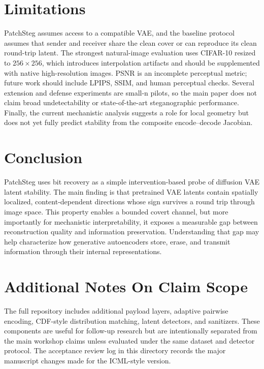 \documentclass{article}
\begin{document}
\section{Limitations}

PatchSteg assumes access to a compatible VAE, and the baseline protocol assumes that sender and receiver share the clean cover or can reproduce its clean round-trip latent. The strongest natural-image evaluation uses CIFAR-10 resized to $256\times256$, which introduces interpolation artifacts and should be supplemented with native high-resolution images. PSNR is an incomplete perceptual metric; future work should include LPIPS, SSIM, and human perceptual checks. Several extension and defense experiments are small-n pilots, so the main paper does not claim broad undetectability or state-of-the-art steganographic performance. Finally, the current mechanistic analysis suggests a role for local geometry but does not yet fully predict stability from the composite encode--decode Jacobian.

\section{Conclusion}

PatchSteg uses bit recovery as a simple intervention-based probe of diffusion VAE latent stability. The main finding is that pretrained VAE latents contain spatially localized, content-dependent directions whose sign survives a round trip through image space. This property enables a bounded covert channel, but more importantly for mechanistic interpretability, it exposes a measurable gap between reconstruction quality and information preservation. Understanding that gap may help characterize how generative autoencoders store, erase, and transmit information through their internal representations.




\appendix

\section{Additional Notes On Claim Scope}

The full repository includes additional payload layers, adaptive pairwise encoding, CDF-style distribution matching, latent detectors, and sanitizers. These components are useful for follow-up research but are intentionally separated from the main workshop claims unless evaluated under the same dataset and detector protocol. The acceptance review log in this directory records the major manuscript changes made for the ICML-style version.
\end{document}
